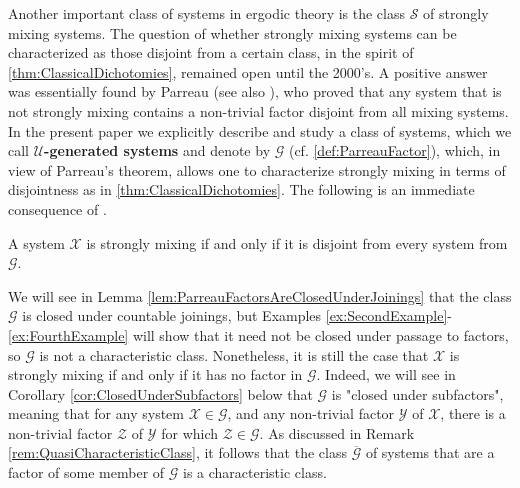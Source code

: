 \documentclass[graybox]{svmult}
\theoremstyle{definition}
\newcommand{\edit}[3]{\color{#1}{#3}\color{black}\marginpar{\textcolor{#1}{[[#2]]}}}
\newcommand{\jpm}[1]{\edit{ggreen}{JPM}{[[#1]]}}
\renewcommand{\emph}[1]{\textbf{#1}}
\begin{document}
Another important class of systems in ergodic theory is the class $\mathcal{S}$ of strongly mixing systems.
The question of whether strongly mixing systems can be characterized as those disjoint from a certain class, in the spirit of \cref{thm:ClassicalDichotomies}, remained open until the 2000's. 
A positive answer was essentially found by Parreau \cite{ParreauFactor} (see also \cite[Theorem 11]{Lemanczyk2009Spectral}), who proved that any system that is not strongly mixing contains a non-trivial factor disjoint from all mixing systems.
In the present paper we explicitly describe and study a class of systems, which we call \emph{$\mathcal U$-generated systems} and denote by $\mathcal{G}$ (cf. \cref{def:ParreauFactor}), which, in view of Parreau's theorem, allows one to characterize strongly mixing in terms of disjointness as in \cref{thm:ClassicalDichotomies}.
The following is an immediate consequence of \cite{ParreauFactor}.
\begin{theorem}\label{thm:ParreauFactorForZ}
A system $\mathcal{X}$ is strongly mixing if and only if it is disjoint from every system from $\mathcal{G}$.
\end{theorem}
We will see in Lemma \ref{lem:ParreauFactorsAreClosedUnderJoinings} that the class $\mathcal{G}$ is closed under countable joinings, but Examples \ref{ex:SecondExample}-\ref{ex:FourthExample} will show that it need not be closed under passage to factors, so $\mathcal{G}$ is not a characteristic class.
Nonetheless, it is still the case that $\mathcal{X}$ is strongly mixing if and only if it has no factor in $\mathcal{G}$.
Indeed, we will see in Corollary \ref{cor:ClosedUnderSubfactors} below that 
 $\mathcal G$ is "closed under subfactors", meaning that for any system $\mathcal{X} \in \mathcal{G}$, and any non-trivial factor $\mathcal{Y}$ of $\mathcal{X}$, there is a non-trivial factor $\mathcal{Z}$ of $\mathcal{Y}$ for which $\mathcal{Z} \in \mathcal{G}$.
 As discussed in Remark \ref{rem:QuasiCharacteristicClass}, it follows that the class $\overline{\mathcal{G}}$ of systems that are a factor of some member of $\mathcal{G}$ is a characteristic class.
 
\end{document}

